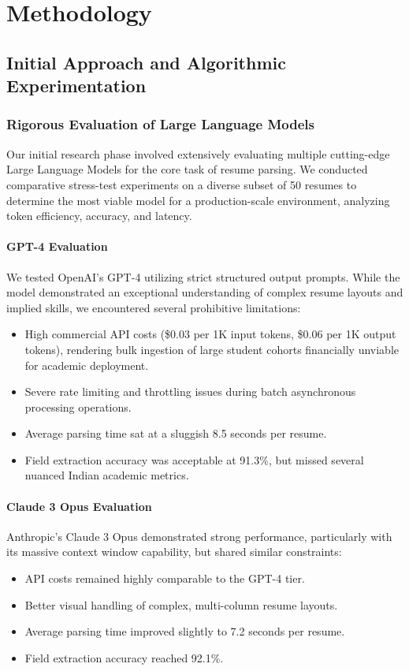 \documentclass[12pt,a4paper]{report}
\begin{document}
\chapter{Methodology}

\section{Initial Approach and Algorithmic Experimentation}

\subsection{Rigorous Evaluation of Large Language Models}

Our initial research phase involved extensively evaluating multiple cutting-edge Large Language Models for the core task of resume parsing. We conducted comparative stress-test experiments on a diverse subset of 50 resumes to determine the most viable model for a production-scale environment, analyzing token efficiency, accuracy, and latency.

\subsubsection{GPT-4 Evaluation}
We tested OpenAI's GPT-4 utilizing strict structured output prompts. While the model demonstrated an exceptional understanding of complex resume layouts and implied skills, we encountered several prohibitive limitations:
\begin{itemize}
    \item High commercial API costs (\$0.03 per 1K input tokens, \$0.06 per 1K output tokens), rendering bulk ingestion of large student cohorts financially unviable for academic deployment.
    \item Severe rate limiting and throttling issues during batch asynchronous processing operations.
    \item Average parsing time sat at a sluggish 8.5 seconds per resume.
    \item Field extraction accuracy was acceptable at 91.3\%, but missed several nuanced Indian academic metrics.
\end{itemize}

\subsubsection{Claude 3 Opus Evaluation}
Anthropic's Claude 3 Opus demonstrated strong performance, particularly with its massive context window capability, but shared similar constraints:
\begin{itemize}
    \item API costs remained highly comparable to the GPT-4 tier.
    \item Better visual handling of complex, multi-column resume layouts.
    \item Average parsing time improved slightly to 7.2 seconds per resume.
    \item Field extraction accuracy reached 92.1\%.
\end{itemize}
\end{document}
